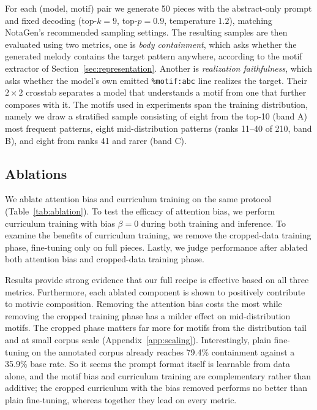 \documentclass{article}
\begin{document}

For each (model, motif) pair we generate 50 pieces with the abstract-only prompt and fixed decoding (top-$k{=}9$, top-$p{=}0.9$, temperature $1.2$), matching NotaGen's recommended sampling settings. The resulting samples are then evaluated using two metrics, one is \textit{body containment}, which asks whether the generated melody contains the target pattern anywhere, according to the motif extractor of Section~\ref{sec:representation}. Another is \textit{realization faithfulness}, which asks whether the model's own emitted \texttt{\%motif:abc} line realizes the target. Their $2\times2$ crosstab separates a model that understands a motif from one that further composes with it. The motifs used in experiments span the training distribution, namely we draw a stratified sample consisting of eight from the top-10 (band A) most frequent patterns, eight mid-distribution patterns (ranks 11--40 of 210, band B), and eight from ranks 41 and rarer (band C).


\subsection{Ablations}
\label{sec:ablations}

We ablate attention bias and curriculum training on the same protocol (Table~\ref{tab:ablation}). To test the efficacy of attention bias, we perform curriculum training with bias $\beta{=}0$ during both training and inference. To examine the benefits of curriculum training, we remove the cropped-data training phase, fine-tuning only on full pieces. Lastly, we judge performance after ablated both attention bias and cropped-data training phase. 

Results provide strong evidence that our full recipe is effective based on all three metrics. Furthermore, each ablated component is shown to positively contribute to motivic composition. Removing the attention bias costs the most while removing the cropped training phase has a milder effect on mid-distribution motifs. The cropped phase matters far more for motifs from the distribution tail and at small corpus scale (Appendix~\ref{app:scaling}). Interestingly, plain fine-tuning on the annotated corpus already reaches 79.4\% containment against a 35.9\% base rate. So it seems the prompt format itself is learnable from data alone, and the motif bias and curriculum training are complementary rather than additive; the cropped curriculum with the bias removed performs no better than plain fine-tuning, whereas together they lead on every metric. 
\end{document}
